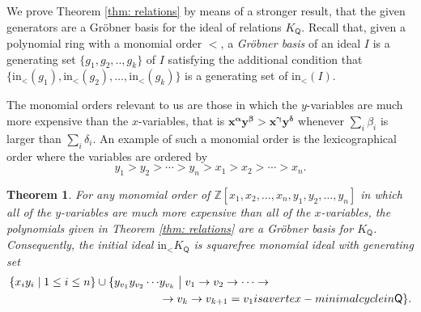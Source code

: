 \documentclass[10pt]{amsart}
\numberwithin{equation}{section}
\newtheorem{thm}{Theorem}[section]
\theoremstyle{definition}
\theoremstyle{remark}
\newcommand{\st}{\bigm\vert}
\newcommand{\1}{^{-1}}
\def\ZZ{\mathbb{Z}}
\def\Q{\mathsf{Q}}
\begin{document}
We prove Theorem \ref{thm: relations} by means of a stronger result, that the given generators are a Gr\"obner basis for the ideal of relations $K_\Q$. 
Recall that, given a polynomial ring with a monomial order $<$, a \textit{Gr\"obner basis} of an ideal $I$ is a generating set $\{g_1,g_2,..,g_k\}$ of $I$ satisfying the additional condition that $\{\text{in}_<(g_1),\text{in}_<(g_2),\dots,\text{in}_<(g_k)\}$ is a generating set of $\text{in}_<(I)$.  

The monomial orders relevant to us are those in which the $y$-variables are much more expensive than the $x$-variables, that is $\mathbf{x}^{\mathbf{\alpha}}\mathbf{y}^{\mathbf{\beta}}> \mathbf{x}^{\mathbf{\gamma}}\mathbf{y}^{\mathbf{\delta}}$ whenever $\sum_i \beta_i$ is larger than $\sum_i \delta_i$.
An example of such a monomial order is the lexicographical order where the variables are ordered by
\[
y_1>y_2>\cdots>y_n>x_1>x_2>\cdots>x_n.
\]


\begin{thm}\label{thm: grobner}
For any monomial order of $\ZZ[x_1,x_2,\dots,x_n,y_1,y_2,\dots,y_n]$ in which all of the $y$-variables are much more expensive than all of the $x$-variables, the polynomials given in Theorem \ref{thm: relations} are a Gr\"obner basis for $K_\Q$. Consequently, the initial ideal $\text{in}_< K_\Q$ is squarefree monomial ideal with generating set
\begin{align*}
\{x_iy_i \mid 1\leq i\leq n\}\cup \{ y_{v_1}y_{v_2}\cdots &y_{v_k}\st v_1\rightarrow v_2\rightarrow \cdots \rightarrow\\
&\rightarrow v_k\rightarrow v_{k+1} = v_1  \textrm{ is a vertex-minimal cycle in }\Q\}.
\end{align*}
\end{thm}
\end{document}
